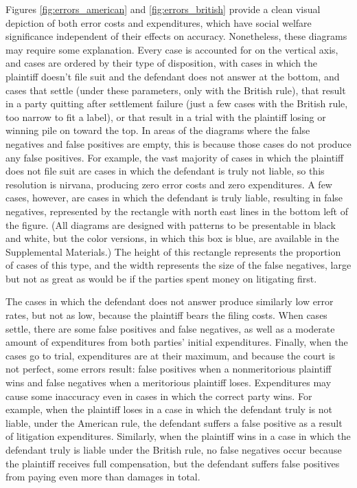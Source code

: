 \documentclass{article}
\begin{document}
Figures \ref{fig:errors_american} and \ref{fig:errors_british} provide a clean visual depiction of both error costs and expenditures, which have social welfare significance independent of their effects on accuracy. Nonetheless, these diagrams may require some explanation. Every case is accounted for on the vertical axis, and cases are ordered by their type of disposition, with cases in which the plaintiff doesn't file suit and the defendant does not answer at the bottom, and cases that settle (under these parameters, only with the British rule), that result in a party quitting after settlement failure (just a few cases with the British rule, too narrow to fit a label), or that result in a trial with the plaintiff losing or winning pile on toward the top. In areas of the diagrams where the false negatives and false positives are empty, this is because those cases do not produce any false positives. For example, the vast majority of cases in which the plaintiff does not file suit are cases in which the defendant is truly not liable, so this resolution is nirvana, producing zero error costs and zero expenditures. A few cases, however, are cases in which the defendant is truly liable, resulting in false negatives, represented by the rectangle with north east lines in the bottom left of the figure. (All diagrams are designed with patterns to be presentable in black and white, but the color versions, in which this box is blue, are available in the Supplemental Materials.) The height of this rectangle represents the proportion of cases of this type, and the width represents the size of the false negatives, large but not as great as would be if the parties spent money on litigating first. 

The cases in which the defendant does not answer produce similarly low error rates, but not as low, because the plaintiff bears the filing costs. When cases settle, there are some false positives and false negatives, as well as a moderate amount of expenditures from both parties' initial expenditures. Finally, when the cases go to trial, expenditures are at their maximum, and because the court is not perfect, some errors result: false positives when a nonmeritorious plaintiff wins and false negatives when a meritorious plaintiff loses. Expenditures may cause some inaccuracy even in cases in which the correct party wins. For example, when the plaintiff loses in a case in which the defendant truly is not liable, under the American rule, the defendant suffers a false positive as a result of litigation expenditures. Similarly, when the plaintiff wins in a case in which the defendant truly is liable under the British rule, no false negatives occur because the plaintiff receives full compensation, but the defendant suffers false positives from paying even more than damages in total.
\end{document}
